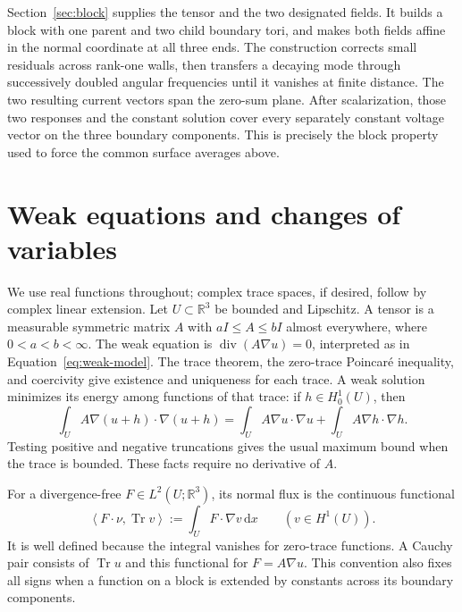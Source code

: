 \documentclass[11pt]{article}
\numberwithin{equation}{section}
\theoremstyle{definition}
\theoremstyle{remark}
\newcommand{\R}{\mathbb R}
\newcommand{\dd}{\,\mathrm d}
\newcommand{\Id}{I}
\DeclareMathOperator{\Div}{div}
\newcommand{\ip}[2]{\left\langle #1,#2\right\rangle}
\begin{document}
Section~\ref{sec:block} supplies the tensor and the two designated
fields. It builds a block with one parent and two child boundary tori,
and makes both fields affine in the normal coordinate at all three
ends. The construction corrects small residuals across rank-one walls,
then transfers a decaying mode through successively doubled angular
frequencies until it vanishes at finite distance. The two resulting
current vectors span the zero-sum plane. After scalarization, those two
responses and the constant solution cover every separately constant
voltage vector on the three boundary components. This is precisely the
block property used to force the common surface averages above.

\section{Weak equations and changes of variables}\label{sec:prelim}

We use real functions throughout; complex trace spaces, if desired,
follow by complex linear extension. Let $U\subset\R^3$ be bounded
and Lipschitz. A tensor is a measurable symmetric matrix $A$ with
$a\Id\leq A\leq b\Id$ almost everywhere, where $0<a<b<\infty$.
The weak equation is $\Div(A\nabla u)=0$, interpreted as in
Equation~\eqref{eq:weak-model}. The trace theorem, the zero-trace
Poincar\'e inequality, and coercivity give existence and uniqueness for
each trace. A weak solution minimizes its energy among functions of
that trace: if $h\in H^1_0(U)$, then
\begin{equation}\label{eq:energy-minimum}
 \int_U A\nabla(u+h)\cdot\nabla(u+h)
 =\int_U A\nabla u\cdot\nabla u+
   \int_U A\nabla h\cdot\nabla h.
\end{equation}
Testing positive and negative truncations gives the usual maximum
bound when the trace is bounded. These facts require no derivative
of $A$.

For a divergence-free $F\in L^2(U;\R^3)$, its normal flux is the
continuous functional
\begin{equation}\label{eq:normal-functional}
 \ip{F\cdot\nu}{\operatorname{Tr}v}
 :=\int_U F\cdot\nabla v\dd x\qquad(v\in H^1(U)).
\end{equation}
It is well defined because the integral vanishes for zero-trace
functions. A Cauchy pair consists of $\operatorname{Tr}u$ and this
functional for $F=A\nabla u$. This convention also fixes all signs
when a function on a block is extended by constants across its
boundary components.
\end{document}
